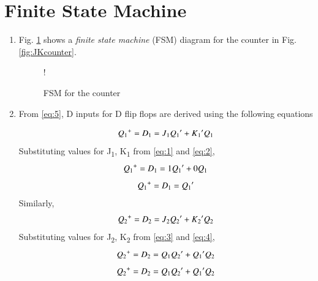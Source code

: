 \documentclass[journal,12pt,twocolumn]{IEEEtran}
\begin{document}
\section{\textbf{Finite State Machine}}
\begin{enumerate}[1.]

\item Fig. \ref{fig:fsm_counter} shows a {\em finite state machine} (FSM) diagram for the counter in Fig. \ref{fig:JKcounter}.    

\begin{figure}[!h]
	\centering
	\resizebox {\columnwidth} {!} {
		
		}
	\caption{FSM for the counter}
	\label{fig:fsm_counter}
\end{figure}

\item From \ref{eq:5}, D inputs for D flip flops are derived using the following equations

\begin{equation}
	Q\textsubscript{1}\textsuperscript{+} = D\textsubscript{1} = J\textsubscript{1}Q\textsubscript{1}^{\prime}+K\textsubscript{1}^{\prime}Q\textsubscript{1}	
\end{equation}
Substituting values for J\textsubscript{1}, K\textsubscript{1} from \ref{eq:1} and \ref{eq:2}, 
\begin{equation}
	Q\textsubscript{1}\textsuperscript{+} = D\textsubscript{1} = 1Q\textsubscript{1}^{\prime}+0Q\textsubscript{1}	
\end{equation}
\begin{equation}
	Q\textsubscript{1}\textsuperscript{+} = D\textsubscript{1} = Q\textsubscript{1}^{\prime} 
\end{equation}
Similarly, 
\begin{equation}
	Q\textsubscript{2}\textsuperscript{+} = D\textsubscript{2} = J\textsubscript{2}Q\textsubscript{2}^{\prime}+K\textsubscript{2}^{\prime}Q\textsubscript{2}	
\end{equation}
Substituting values for J\textsubscript{2}, K\textsubscript{2} from \ref{eq:3} and \ref{eq:4},
\begin{equation}
	Q\textsubscript{2}\textsuperscript{+} = D\textsubscript{2} = Q\textsubscript{1}Q\textsubscript{2}^{\prime}+Q\textsubscript{1}^{\prime}Q\textsubscript{2}	
\end{equation}
\begin{equation}
	Q\textsubscript{2}\textsuperscript{+} = D\textsubscript{2} = Q\textsubscript{1}Q\textsubscript{2}^{\prime}+Q\textsubscript{1}^{\prime}Q\textsubscript{2}
\end{equation}


\end{enumerate}
\end{document}
